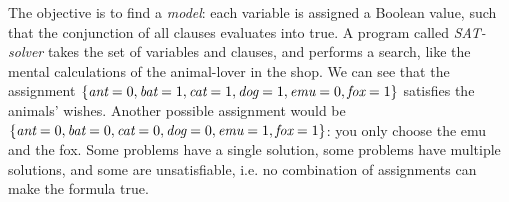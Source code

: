 


The objective is to find a \emph{model}: each variable is assigned a Boolean value, such that the conjunction of all clauses evaluates into true. A program called \emph{SAT-solver} takes the set of variables and clauses, and performs a search, like the mental calculations of the animal-lover in the shop.
We can see that the assignment $\{\text{\em ant}=0, \text{\em bat}=1, \text{\em cat}=1, \text{\em dog}=1, \text{\em emu}=0, \text{\em fox}=1\}$
satisfies the animals' wishes.
Another possible assignment would be $\{\text{\em ant}=0, \text{\em bat}=0, \text{\em cat}=0, \text{\em dog}=0, \text{\em emu}=1, \text{\em fox}=1\}$: you only choose the emu and the fox. 
Some problems have a single solution, some problems have multiple solutions, and some are unsatisfiable, i.e. no combination of assignments can make the formula true.

